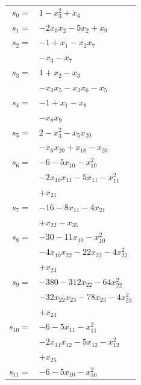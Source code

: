 \begingroup
\small
\setlength{\tabcolsep}{2pt}
\setlength{\LTleft}{0pt}
\begin{longtable}{@{}r@{\;}l@{}}
\(s_{0}=\) & \(\displaystyle 1 -x_{3}^{2} +x_{4}\) \\[3pt]
\(s_{1}=\) & \(\displaystyle -2x_{0}x_{2} -5x_{2} +x_{9}\) \\[3pt]
\(s_{2}=\) & \(\displaystyle -1 +x_{1} -x_{2}x_{7}\) \\
 & \(\displaystyle -x_{3} -x_{7}\) \\[3pt]
\(s_{3}=\) & \(\displaystyle 1 +x_{2} -x_{3}\) \\
 & \(\displaystyle -x_{3}x_{5} -x_{3}x_{6} -x_{5}\) \\[3pt]
\(s_{4}=\) & \(\displaystyle -1 +x_{1} -x_{8}\) \\
 & \(\displaystyle -x_{8}x_{9}\) \\[3pt]
\(s_{5}=\) & \(\displaystyle 2 -x_{3}^{2} -x_{5}x_{20}\) \\
 & \(\displaystyle -x_{6}x_{20} +x_{18} -x_{20}\) \\[3pt]
\(s_{6}=\) & \(\displaystyle -6 -5x_{10} -x_{10}^{2}\) \\
 & \(\displaystyle -2x_{10}x_{11} -5x_{11} -x_{11}^{2}\) \\
 & \(\displaystyle +x_{21}\) \\[3pt]
\(s_{7}=\) & \(\displaystyle -16 -8x_{11} -4x_{21}\) \\
 & \(\displaystyle +x_{22} -x_{35}\) \\[3pt]
\(s_{8}=\) & \(\displaystyle -30 -11x_{10} -x_{10}^{2}\) \\
 & \(\displaystyle -4x_{10}x_{22} -22x_{22} -4x_{22}^{2}\) \\
 & \(\displaystyle +x_{23}\) \\[3pt]
\(s_{9}=\) & \(\displaystyle -380 -312x_{22} -64x_{22}^{2}\) \\
 & \(\displaystyle -32x_{22}x_{23} -78x_{23} -4x_{23}^{2}\) \\
 & \(\displaystyle +x_{24}\) \\[3pt]
\(s_{10}=\) & \(\displaystyle -6 -5x_{11} -x_{11}^{2}\) \\
 & \(\displaystyle -2x_{11}x_{12} -5x_{12} -x_{12}^{2}\) \\
 & \(\displaystyle +x_{25}\) \\[3pt]
\(s_{11}=\) & \(\displaystyle -6 -5x_{10} -x_{10}^{2}\) \\

\end{longtable}
